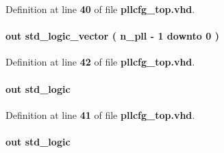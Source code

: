 Definition at line {\bf 40} of file {\bf pllcfg\+\_\+top.\+vhd}.

\paragraph[{phcfg\+\_\+start}]{ {\bfseries \textcolor{keywordflow}{out}\textcolor{vhdlchar}{ }} {\bfseries \textcolor{comment}{std\+\_\+logic\+\_\+vector}\textcolor{vhdlchar}{ }\textcolor{vhdlchar}{(}\textcolor{vhdlchar}{ }\textcolor{vhdlchar}{ }\textcolor{vhdlchar}{ }\textcolor{vhdlchar}{ }{\bfseries {\bf n\+\_\+pll}} \textcolor{vhdlchar}{-\/}\textcolor{vhdlchar}{ } \textcolor{vhdldigit}{1} \textcolor{vhdlchar}{ }\textcolor{keywordflow}{downto}\textcolor{vhdlchar}{ }\textcolor{vhdlchar}{ } \textcolor{vhdldigit}{0} \textcolor{vhdlchar}{ }\textcolor{vhdlchar}{)}\textcolor{vhdlchar}{ }} \hspace{0.3cm}{\ttfamily [Port]}}\label{classpllcfg__top_a410dd9ec914352fd5335f6a6e8060717}


Definition at line {\bf 42} of file {\bf pllcfg\+\_\+top.\+vhd}.

\paragraph[{phcfg\+\_\+tst}]{ {\bfseries \textcolor{keywordflow}{out}\textcolor{vhdlchar}{ }} {\bfseries \textcolor{comment}{std\+\_\+logic}\textcolor{vhdlchar}{ }} \hspace{0.3cm}{\ttfamily [Port]}}\label{classpllcfg__top_ab5f5d4e9c2405fb83741eedaf2c45f92}


Definition at line {\bf 41} of file {\bf pllcfg\+\_\+top.\+vhd}.

\paragraph[{phcfg\+\_\+updn}]{ {\bfseries \textcolor{keywordflow}{out}\textcolor{vhdlchar}{ }} {\bfseries \textcolor{comment}{std\+\_\+logic}\textcolor{vhdlchar}{ }} \hspace{0.3cm}{\ttfamily [Port]}}\label{classpllcfg__top_a10148149d3d95f09e47cc7f7f11761b5}


